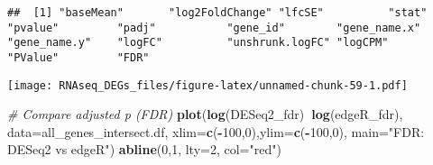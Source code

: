 \documentclass[]{book}
\newenvironment{Shaded}{\begin{snugshade}}{\end{snugshade}}
\newcommand{\KeywordTok}[1]{\textcolor[rgb]{0.13,0.29,0.53}{\textbf{#1}}}
\newcommand{\DataTypeTok}[1]{\textcolor[rgb]{0.13,0.29,0.53}{#1}}
\newcommand{\DecValTok}[1]{\textcolor[rgb]{0.00,0.00,0.81}{#1}}
\newcommand{\StringTok}[1]{\textcolor[rgb]{0.31,0.60,0.02}{#1}}
\newcommand{\CommentTok}[1]{\textcolor[rgb]{0.56,0.35,0.01}{\textit{#1}}}
\newcommand{\OperatorTok}[1]{\textcolor[rgb]{0.81,0.36,0.00}{\textbf{#1}}}
\newcommand{\NormalTok}[1]{#1}
\begin{document}
\begin{verbatim}
##  [1] "baseMean"       "log2FoldChange" "lfcSE"          "stat"           "pvalue"         "padj"           "gene_id"        "gene_name.x"    "gene_name.y"    "logFC"          "unshrunk.logFC" "logCPM"         "PValue"         "FDR"
\end{verbatim}

\begin{Shaded}
\end{Shaded}

\texttt{[image: RNAseq\_DEGs\_files/figure-latex/unnamed-chunk-59-1.pdf]}

\begin{Shaded}
\begin{Highlighting}[]
\CommentTok{# Compare adjusted p (FDR)}
\KeywordTok{plot}\NormalTok{(}\KeywordTok{log}\NormalTok{(DESeq2_fdr)}\OperatorTok{~}\KeywordTok{log}\NormalTok{(edgeR_fdr), }
     \DataTypeTok{data=}\NormalTok{all_genes_intersect.df, }
     \DataTypeTok{xlim=}\KeywordTok{c}\NormalTok{(}\OperatorTok{-}\DecValTok{100}\NormalTok{,}\DecValTok{0}\NormalTok{),}\DataTypeTok{ylim=}\KeywordTok{c}\NormalTok{(}\OperatorTok{-}\DecValTok{100}\NormalTok{,}\DecValTok{0}\NormalTok{),}
     \DataTypeTok{main=}\StringTok{"FDR: DESeq2 vs edgeR"}\NormalTok{)}
\KeywordTok{abline}\NormalTok{(}\DecValTok{0}\NormalTok{,}\DecValTok{1}\NormalTok{, }\DataTypeTok{lty=}\DecValTok{2}\NormalTok{, }\DataTypeTok{col=}\StringTok{"red"}\NormalTok{)}
\end{Highlighting}
\end{Shaded}
\end{document}
